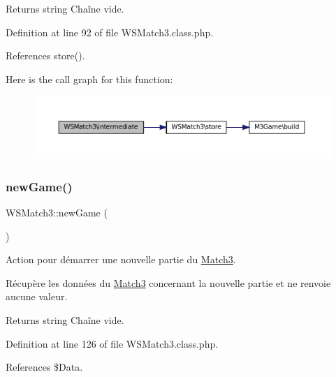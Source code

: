 \begin{DoxyReturn}{Returns}
string Chaîne vide. 
\end{DoxyReturn}


Definition at line 92 of file W\+S\+Match3.\+class.\+php.



References store().

Here is the call graph for this function\+:\nopagebreak
\begin{figure}[H]
\begin{center}
\leavevmode
\includegraphics[width=350pt]{class_w_s_match3_afbcd987857d22156e83f94015f6be8ad_cgraph}
\end{center}
\end{figure}
\mbox{\label{class_w_s_match3_ac52182880ce359a41be077b9ad4142b3}} 
\subsubsection{\texorpdfstring{new\+Game()}{newGame()}}
{\footnotesize\ttfamily W\+S\+Match3\+::new\+Game (\begin{DoxyParamCaption}{ }\end{DoxyParamCaption})\hspace{0.3cm}{\ttfamily [protected]}}

Action pour démarrer une nouvelle partie du \hyperlink{class_match3}{Match3}.

Récupère les données du \hyperlink{class_match3}{Match3} concernant la nouvelle partie et ne renvoie aucune valeur.

\begin{DoxyReturn}{Returns}
string Chaîne vide. 
\end{DoxyReturn}


Definition at line 126 of file W\+S\+Match3.\+class.\+php.



References \$\+Data.

\mbox{\label{class_w_s_match3_a63e3018032202b5d6f55de7013500aa3}} 
